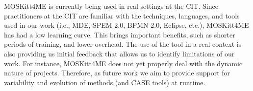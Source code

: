 \documentclass[runningheads,a4paper]{llncs}
\begin{document}
MOSKitt4ME is currently being used in real settings at the CIT. Since
practitioners at the CIT are familiar with the techniques, languages, and tools
used in our work (i.e., MDE, SPEM 2.0, BPMN 2.0, Eclipse, etc.), MOSKitt4ME
has had a low learning curve. This brings important benefits, such as shorter
periods of training, and lower overhead. The use of the tool in a real context
is also providing us initial feedback that allows us to identify limitations of
our work. For instance, MOSKitt4ME does not yet properly deal with the dynamic
nature of projects. Therefore, as future work we aim to provide support for
variability and evolution of methods (and CASE tools) at runtime.



\end{document}
